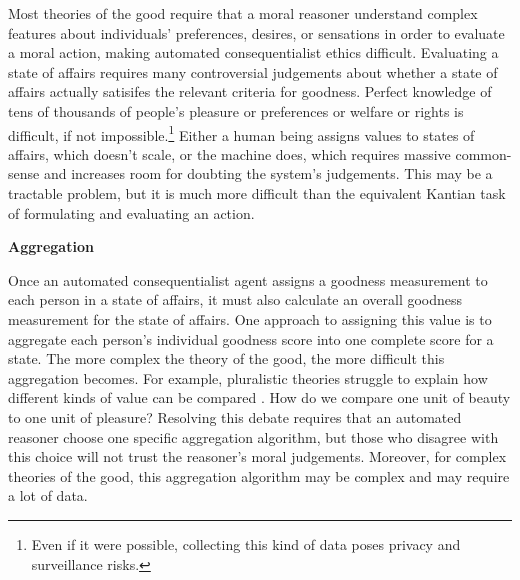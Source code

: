 \begin{isabellebody}
\begin{isamarkuptext}
Most theories of the good require that a moral reasoner understand complex features about
individuals' preferences, desires, or sensations in order to evaluate a moral action, making automated
consequentialist ethics difficult. Evaluating a state of affairs requires many controversial
judgements about whether a state of affairs actually satisifes the relevant criteria for goodness. 
Perfect knowledge of tens of thousands of people's pleasure or preferences or welfare or rights is 
difficult, if not impossible.\footnote{Even if it were possible, collecting this kind of data poses 
privacy and surveillance risks.} Either a human being 
assigns values to states of affairs, which doesn't scale, or the machine does, 
which requires massive common-sense and increases room for doubting the system's judgements. This may be 
a tractable problem, but it is much more difficult than the equivalent Kantian task of formulating
and evaluating an action.%
\end{isamarkuptext}\isamarkuptrue%
%
\begin{isamarkuptext}%
\noindent \textbf{Aggregation}%
\end{isamarkuptext}\isamarkuptrue%
%
\begin{isamarkuptext}%
Once an automated consequentialist agent assigns a goodness measurement to each person in a state of affairs, it 
must also calculate an overall goodness measurement for the state of affairs. One approach to assigning
this value is to aggregate each person's individual goodness score into one complete score for a state. 
The more complex the theory of the good, the more difficult this aggregation becomes. For example, 
pluralistic theories struggle to explain how different kinds of value can be compared \citep{consequentialismsep}. 
How do we compare one unit of beauty to one unit of pleasure? Resolving this debate requires that an automated reasoner 
choose one specific aggregation algorithm, but those who disagree with this choice will not trust 
the reasoner's moral judgements. Moreover, for complex theories of the good, this aggregation algorithm
may be complex and may require a lot of data. 


\end{isamarkuptext}
\end{isabellebody}
